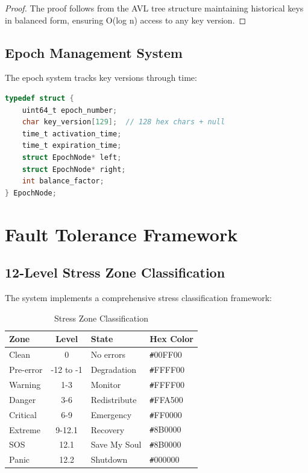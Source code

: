 \documentclass[12pt,a4paper]{report}
\theoremstyle{definition}
\newcommand{\hex}[1]{\texttt{\#}#1}
\begin{document}
\begin{proof}
The proof follows from the AVL tree structure maintaining historical keys in balanced form, ensuring O(log n) access to any key version.
\end{proof}

\subsection{Epoch Management System}

The epoch system tracks key versions through time:

\begin{lstlisting}[language=C, caption=Epoch Management Structure]
typedef struct {
    uint64_t epoch_number;
    char key_version[129];  // 128 hex chars + null
    time_t activation_time;
    time_t expiration_time;
    struct EpochNode* left;
    struct EpochNode* right;
    int balance_factor;
} EpochNode;
\end{lstlisting}

\section{Fault Tolerance Framework}

\subsection{12-Level Stress Zone Classification}

The system implements a comprehensive stress classification framework:

\begin{table}[h]
\centering
\caption{Stress Zone Classification}
\begin{tabular}{|l|c|l|l|}
\hline
\textbf{Zone} & \textbf{Level} & \textbf{State} & \textbf{Hex Color} \\
\hline
Clean & 0 & No errors & \hex{00FF00} \\
Pre-error & -12 to -1 & Degradation & \hex{FFFF00} \\
Warning & 1-3 & Monitor & \hex{FFFF00} \\
Danger & 3-6 & Redistribute & \hex{FFA500} \\
Critical & 6-9 & Emergency & \hex{FF0000} \\
Extreme & 9-12.1 & Recovery & \hex{8B0000} \\
SOS & 12.1 & Save My Soul & \hex{8B0000} \\
Panic & 12.2 & Shutdown & \hex{000000} \\
\hline
\end{tabular}
\end{table}
\end{document}
